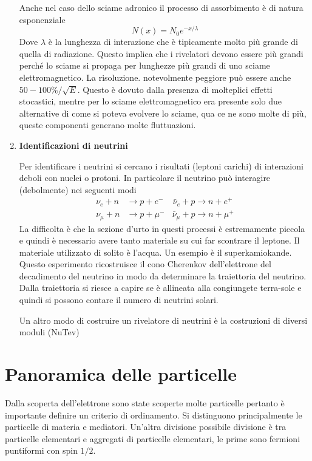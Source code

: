 \documentclass[12pt]{book}
\begin{document}
\begin{enumerate}
Anche nel caso dello sciame adronico il processo di assorbimento è di natura esponenziale
\begin{equation}
	N(x)=N_0 e^{-x/\lambda}
\end{equation}
Dove $\lambda$ è la lunghezza di interazione che è tipicamente molto più grande di quella di radiazione. Questo implica che i rivelatori devono essere più grandi perché lo sciame si propaga per lunghezze più grandi di uno sciame elettromagnetico. La risoluzione. notevolmente peggiore può essere anche $50-100 \% / \sqrt{E}$. Questo è dovuto dalla presenza di molteplici effetti stocastici, mentre per lo sciame elettromagnetico era presente solo due alternative di come si poteva evolvere lo sciame, qua ce ne sono molte di più, queste componenti generano molte fluttuazioni.

\item \textbf{Identificazioni di neutrini}

Per identificare i neutrini si cercano i risultati (leptoni carichi) di interazioni deboli con nuclei o protoni. In particolare il neutrino può interagire (debolmente) nei seguenti modi
\begin{align*}
	\nu_e + n &\rightarrow p + \boxed{e^-} \ \ \ \ \ \bar \nu_e + p \rightarrow n + \boxed{e^+}\\
	\nu_\mu + n &\rightarrow p + \boxed{\mu^-}  \ \ \ \ \bar \nu_\mu + p \rightarrow n + \boxed{\mu ^+}
\end{align*}
La difficolta è che la sezione d'urto in questi processi è estremamente piccola e quindi è necessario avere tanto materiale su cui far scontrare il leptone. Il materiale utilizzato di solito è l'acqua. Un esempio è il superkamiokande. Questo esperimento ricostruisce il cono Cherenkov dell'elettrone del decadimento del neutrino in modo da determinare  la traiettoria del neutrino. Dalla traiettoria si riesce a capire se è allineata alla congiungete terra-sole e quindi si possono contare il numero di neutrini solari.

Un altro modo di costruire un rivelatore di neutrini è la costruzioni di diversi moduli (NuTev) 

\end{enumerate}
 




 
 \newpage
 \section{Panoramica delle particelle}
 \toc
 Dalla scoperta dell'elettrone sono state scoperte molte particelle pertanto è importante definire un criterio di ordinamento. Si distinguono principalmente le particelle di materia e mediatori. Un'altra divisione possibile divisione è tra particelle elementari e aggregati di particelle elementari, le prime sono fermioni puntiformi con spin $1/2$.
 
\end{document}
